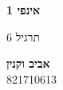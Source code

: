 \documentclass[a4paper, 12pt]{article}
\begin{document}

    \begin{center}
        \vspace*{4cm}

        \fontsize{43pt}{45pt}\selectfont
        \textbf{אינפי 1}
            
        \vspace{0.4cm}

        \LARGE
        תרגיל 6

        \vfill
            
        \Large\textbf{אביב וקנין}\\
        821710613
    \end{center}
\end{document}
